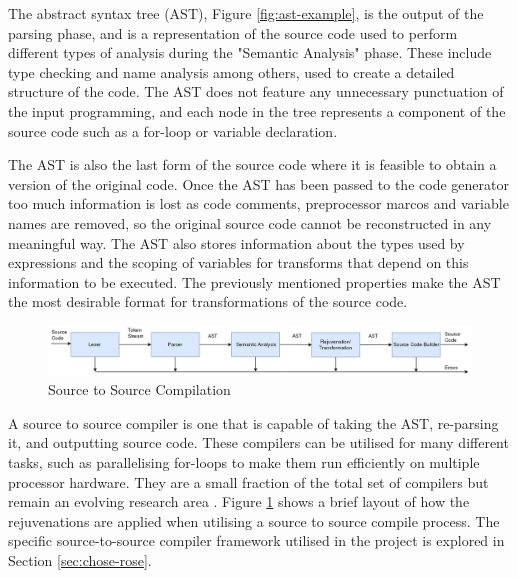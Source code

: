 \documentclass[bsc,frontabs,singlespacing,twoside,parskip,deptreport]{infthesis}
\begin{document}
The abstract syntax tree (AST), Figure \ref{fig:ast-example}, is the output of the parsing phase, and is a representation of the source code used to perform different types of analysis during the "Semantic Analysis" phase. These include type checking and name analysis among others, used to create a detailed structure of the code. The AST does not feature any unnecessary punctuation of the input programming, and each node in the tree represents a component of the source code such as a for-loop or variable declaration.


The AST is also the last form of the source code where it is feasible to obtain a version of the original code. Once the AST has been passed to the code generator too much information is lost as code comments, preprocessor marcos \cite{C_MARCOS} and variable names are removed, so the original source code cannot be reconstructed in any meaningful way. The AST also stores information about the types used by expressions and the scoping of variables for transforms that depend on this information to be executed. The previously mentioned properties make the AST the most desirable format for transformations of the source code. 

\begin{figure}[!h]
    \centering
    \includegraphics[width=\textwidth]{images/Compilation-process-src.png}
    \caption{Source to Source Compilation}
    \label{fig:comp_proc_src}
\end{figure}

A source to source compiler is one that is capable of taking the AST, re-parsing it, and outputting source code. These compilers can be utilised for many different tasks, such as parallelising for-loops to make them run efficiently on multiple processor hardware. They are a small fraction of the total set of compilers but remain an evolving research area \cite{SRC_CODE_RES}. Figure \ref{fig:comp_proc_src} shows a brief layout of how the rejuvenations are applied when utilising a source to source compile process. The specific source-to-source compiler framework utilised in the project is explored in Section \ref{sec:chose-rose}.

\end{document}
